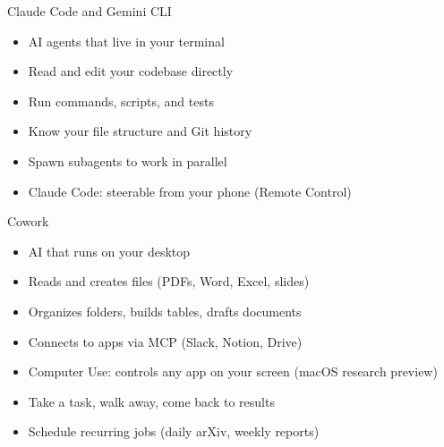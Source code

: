 \documentclass[aspectratio=169]{beamer}
\begin{document}
\begin{frame}{Claude Code and Gemini CLI}
    \begin{itemize}
        \item AI agents that live in your terminal
        \vspace{0.3em}
        \item Read and edit your codebase directly
        \vspace{0.3em}
        \item Run commands, scripts, and tests
        \vspace{0.3em}
        \item Know your file structure and Git history
        \vspace{0.3em}
        \item Spawn subagents to work in parallel
        \vspace{0.3em}
        \item Claude Code: steerable from your phone (Remote Control)
    \end{itemize}
\end{frame}

\begin{frame}{Cowork}
    \begin{itemize}
        \item AI that runs on your desktop
        \vspace{0.3em}
        \item Reads and creates files (PDFs, Word, Excel, slides)
        \vspace{0.3em}
        \item Organizes folders, builds tables, drafts documents
        \vspace{0.3em}
        \item Connects to apps via MCP (Slack, Notion, Drive)
        \vspace{0.3em}
        \item Computer Use: controls any app on your screen (macOS research preview)
        \vspace{0.3em}
        \item Take a task, walk away, come back to results
        \vspace{0.3em}
        \item Schedule recurring jobs (daily arXiv, weekly reports)
    \end{itemize}
\end{frame}
\end{document}
